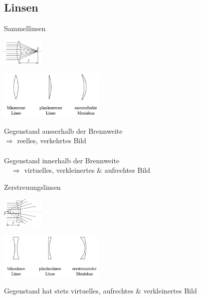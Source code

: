 \subsection{Linsen  }
\begin{minipage}[]{3.5cm}
	Sammellinsen
\end{minipage}
\begin{minipage}[]{2cm}
	\includegraphics[width=2cm]{./bilder/sammelprinzip.png}
\end{minipage}
\begin{minipage}[]{5cm}
	\includegraphics[width=5cm]{./bilder/sammellinsen.png}
\end{minipage}
\begin{minipage}[]{7.5cm}
	\small
		Gegenstand ausserhalb der Brennweite \\
			$\Rightarrow$ reelles, verkehrtes Bild \\ \\
		Gegenstand innerhalb der Brennweite \\
    		$\quad \Rightarrow$ virtuelles, verkleinertes \& aufrechtes Bild
\end{minipage}

\begin{minipage}[]{3.5cm}
	Zerstreuungslinsen
\end{minipage}
\begin{minipage}[]{2cm}
	\includegraphics[width=2cm]{./bilder/streuprinzip.png}
\end{minipage}
\begin{minipage}[]{5cm}
	\includegraphics[width=5cm]{./bilder/streulinsen.png}
\end{minipage}
\begin{minipage}[]{7.5cm}
	\small
		Gegenstand hat stets virtuelles, aufrechtes \& verkleinertes Bild
\end{minipage}



